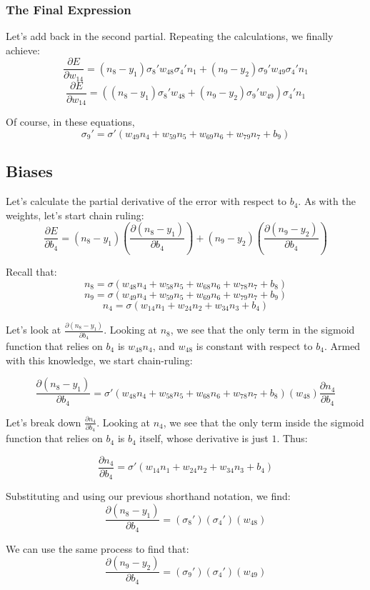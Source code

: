\documentclass{article}
\begin{document}
\subsubsection{The Final Expression}

Let's add back in the second partial. Repeating the calculations, we finally achieve:
\[\dfrac{\partial E}{\partial w_{14}} = (n_8-y_1)\sigma_8'w_{48}\sigma_4'n_1 + (n_9-y_2)\sigma_9'w_{49}\sigma_4'n_1\]
\[\dfrac{\partial E}{\partial w_{14}} = \left((n_8-y_1)\sigma_8'w_{48} + (n_9-y_2)\sigma_9'w_{49}\right)\sigma_4'n_1\]

Of course, in these equations,
\[\sigma_9' = \sigma'(w_{49}n_4 + w_{59}n_5 + w_{69}n_6 + w_{79}n_7 + b_9)\]

\subsection{Biases}
Let's calculate the partial derivative of the error with respect to $b_4$.
As with the weights, let's start chain ruling:
\[\dfrac{\partial E}{\partial b_4} = (n_8-y_1)\left(\frac{\partial{(n_8-y_1)}}{\partial b_4}\right)+(n_9-y_2)\left(\frac{\partial{(n_9-y_2)}}{\partial b_4}\right)\]

Recall that:
\[n_8 = \sigma(w_{48}n_4 + w_{58}n_5 + w_{68}n_6 + w_{78}n_7 + b_8)\]
\[n_9 = \sigma(w_{49}n_4 + w_{59}n_5 + w_{69}n_6 + w_{79}n_7 + b_9)\]
\[n_4 = \sigma(w_{14}n_1 + w_{24}n_2 + w_{34}n_3 + b_4)\]

Let's look at $\frac{\partial{(n_8-y_1)}}{\partial b_4}$. Looking at $n_8$, we see that the only term in the sigmoid function that relies on $b_4$ is $w_{48}n_4$, and $w_{48}$ is constant with respect to $b_4$. Armed with this knowledge, we start chain-ruling:

\[\frac{\partial{(n_8-y_1)}}{\partial b_4} =  \sigma'(w_{48}n_4 + w_{58}n_5 + w_{68}n_6 + w_{78}n_7 + b_8)(w_{48})\frac{\partial{n_4}}{\partial b_4} \]

Let's break down $\frac{\partial{n_4}}{\partial b_4}$. Looking at $n_4$, we see that the only term inside the sigmoid function that relies on $b_4$ is $b_4$ itself, whose derivative is just $1$. Thus:

\[\frac{\partial{n_4}}{\partial b_4} = \sigma'(w_{14}n_1 + w_{24}n_2 + w_{34}n_3 + b_4) \]

Substituting and using our previous shorthand notation, we find:
\[\frac{\partial{(n_8-y_1)}}{\partial b_4} =  (\sigma_8')(\sigma_4')(w_{48})\]

We can use the same process to find that:
\[\frac{\partial{(n_9-y_2)}}{\partial b_4} = (\sigma_9')(\sigma_4')(w_{49}) \]
\end{document}
